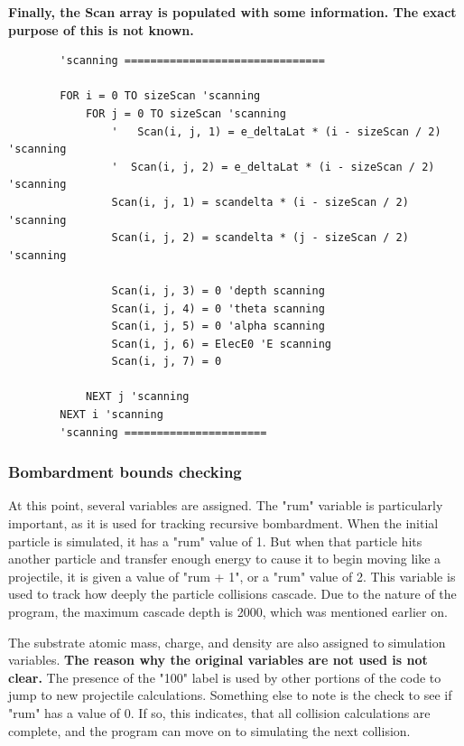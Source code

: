 \documentclass[10pt, reqno]{exam}
\begin{document}
\textbf{Finally, the Scan array is populated with some information. The exact purpose of this is not known.}
\begin{verbatim}
        'scanning ===============================
    
        FOR i = 0 TO sizeScan 'scanning
            FOR j = 0 TO sizeScan 'scanning
                '   Scan(i, j, 1) = e_deltaLat * (i - sizeScan / 2) 'scanning
                '  Scan(i, j, 2) = e_deltaLat * (i - sizeScan / 2) 'scanning
                Scan(i, j, 1) = scandelta * (i - sizeScan / 2) 'scanning
                Scan(i, j, 2) = scandelta * (j - sizeScan / 2) 'scanning
    
                Scan(i, j, 3) = 0 'depth scanning
                Scan(i, j, 4) = 0 'theta scanning
                Scan(i, j, 5) = 0 'alpha scanning
                Scan(i, j, 6) = ElecE0 'E scanning
                Scan(i, j, 7) = 0
    
            NEXT j 'scanning
        NEXT i 'scanning
        'scanning ======================
\end{verbatim}
\subsubsection{Bombardment bounds checking}
\label{sec:bounds checking}

At this point, several variables are assigned. The "rum" variable is particularly important, as it is used for tracking recursive bombardment. When the initial particle is simulated, it has a "rum" value of 1. But when that particle hits another particle and transfer enough energy to cause it to begin moving like a projectile, it is given a value of "rum + 1", or a "rum" value of 2. This variable is used to track how deeply the particle collisions cascade. Due to the nature of the program, the maximum cascade depth is 2000, which was mentioned earlier on. \par

The substrate atomic mass, charge, and density are also assigned to simulation variables. \textbf{The reason why the original variables are not used is not clear.} The presence of the "100" label is used by other portions of the code to jump to new projectile calculations. Something else to note is the check to see if "rum" has a value of 0. If so, this indicates, that all collision calculations are complete, and the program can move on to simulating the next collision. \par
\end{document}
